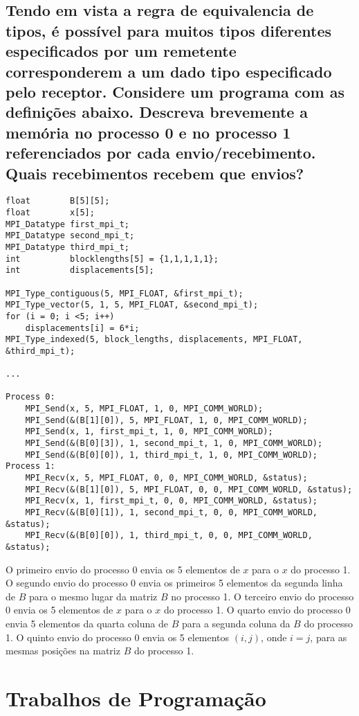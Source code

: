\documentclass[11pt,a4paper,onecolumn]{article}
\begin{document}
\subsection{Tendo em vista a regra de equivalencia de tipos, é possível para muitos tipos diferentes especificados por um remetente corresponderem a um dado tipo especificado pelo receptor. Considere um programa com as definições abaixo. Descreva brevemente a memória no processo 0 e no processo 1 referenciados por cada envio/recebimento. Quais recebimentos recebem que envios?}
\begin{lstlisting}[style=cc]
float        B[5][5];
float        x[5];
MPI_Datatype first_mpi_t;
MPI_Datatype second_mpi_t;
MPI_Datatype third_mpi_t;
int          blocklengths[5] = {1,1,1,1,1};      
int          displacements[5];

MPI_Type_contiguous(5, MPI_FLOAT, &first_mpi_t);
MPI_Type_vector(5, 1, 5, MPI_FLOAT, &second_mpi_t);
for (i = 0; i <5; i++)
    displacements[i] = 6*i;
MPI_Type_indexed(5, block_lengths, displacements, MPI_FLOAT, &third_mpi_t);

...

Process 0:
    MPI_Send(x, 5, MPI_FLOAT, 1, 0, MPI_COMM_WORLD);
    MPI_Send(&(B[1][0]), 5, MPI_FLOAT, 1, 0, MPI_COMM_WORLD);
    MPI_Send(x, 1, first_mpi_t, 1, 0, MPI_COMM_WORLD);
    MPI_Send(&(B[0][3]), 1, second_mpi_t, 1, 0, MPI_COMM_WORLD);
    MPI_Send(&(B[0][0]), 1, third_mpi_t, 1, 0, MPI_COMM_WORLD);
Process 1:
    MPI_Recv(x, 5, MPI_FLOAT, 0, 0, MPI_COMM_WORLD, &status);
    MPI_Recv(&(B[1][0]), 5, MPI_FLOAT, 0, 0, MPI_COMM_WORLD, &status);
    MPI_Recv(x, 1, first_mpi_t, 0, 0, MPI_COMM_WORLD, &status);
    MPI_Recv(&(B[0][1]), 1, second_mpi_t, 0, 0, MPI_COMM_WORLD, &status);
    MPI_Recv(&(B[0][0]), 1, third_mpi_t, 0, 0, MPI_COMM_WORLD, &status);
\end{lstlisting}

O primeiro envio do processo 0 envia os 5 elementos de $x$ para o $x$ do processo 1.
O segundo envio do processo 0 envia os primeiros 5 elementos da segunda linha de $B$ para o mesmo lugar da matriz $B$ no processo 1.
O terceiro envio do processo 0 envia os 5 elementos de $x$ para o $x$ do processo 1.
O quarto envio do processo 0 envia 5 elementos da quarta coluna de $B$ para a segunda coluna da $B$ do processo 1.
O quinto envio do processo 0 envia os 5 elementos $(i,j)$, onde $i = j$, para as mesmas posições na matriz $B$ do processo 1.

\section{Trabalhos de Programação}
\end{document}
